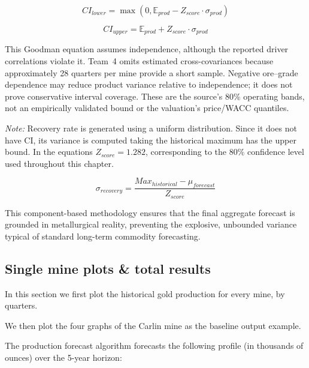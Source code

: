 \begin{equation}
    CI_{lower} = \max(0, \mathbb{E}_{prod} - Z_{score} \cdot \sigma_{prod})
\end{equation}

\begin{equation}
CI_{upper} = \mathbb{E}_{prod} + Z_{score} \cdot \sigma_{prod}
\end{equation}

This Goodman equation assumes independence, although the reported driver
correlations violate it. Team~4 omits estimated cross-covariances because
approximately 28 quarters per mine provide a short sample. Negative
ore--grade dependence may reduce product variance relative to independence;
it does not prove conservative interval coverage. These are the source's
80\% operating bands, not an empirically validated bound or the valuation's
price/WACC quantiles.

\textit{Note:} Recovery rate is generated using a uniform distribution. Since it does not have CI, its variance is computed taking the historical maximum has the upper bound. In the equations $Z_{score} = 1.282$, corresponding to the $80\%$ confidence level used throughout this chapter.

\begin{equation}
    \sigma_{recovery}=\frac{Max_{historical}-\mu_{forecast}}{Z_{score}}
\end{equation}

This component-based methodology ensures that the final aggregate forecast is grounded in metallurgical reality, preventing the explosive, unbounded variance typical of standard long-term commodity forecasting.
\subsection{Single mine plots \& total results}
In this section we first plot the historical gold production for every mine, by quarters.



We then plot the four graphs of the Carlin mine as the baseline output example.



The production forecast algorithm forecasts the following profile (in thousands of ounces) over the 5-year horizon:



